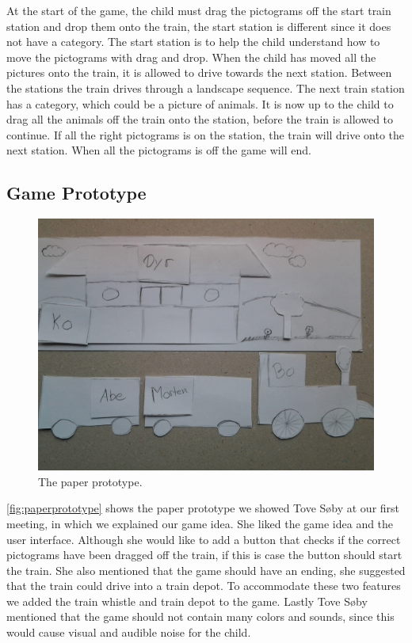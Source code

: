 At the start of the game, the child must drag the pictograms off the start train station and drop them onto the train, the start station is different since it does not have a category. The start station is to help the child understand how to move the pictograms with drag and drop. When the child has moved all the pictures onto the train, it is allowed to drive towards the next station. Between the stations the train drives through a landscape sequence. The next train station has a category, which could be a picture of animals. It is now up to the child to drag all the animals off the train onto the station, before the train is allowed to continue. If all the right pictograms is on the station, the train will drive onto the next station. When all the pictograms is off the game will end.

\subsection{Game Prototype}
\begin{figure}[H]
\centering
\includegraphics[width=0.9\linewidth]{img/screenshots/prototype1.jpg}
\caption{The paper prototype.}
\label{fig:paperprototype}
\end{figure}
\autoref{fig:paperprototype} shows the paper prototype we showed Tove Søby at our first meeting, in which we explained our game idea. She liked the game idea and the user interface. Although she would like to add a button that checks if the correct pictograms have been dragged off the train, if this is case the button should start the train. She also mentioned that the game should have an ending, she suggested that the train could drive into a train depot. To accommodate these two features we added the train whistle and train depot to the game. 
Lastly Tove Søby mentioned that the game should not contain many colors and sounds, since this would cause visual and audible noise for the child. 


